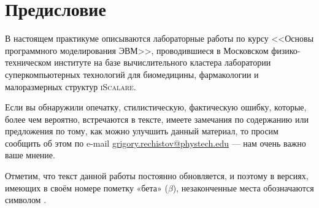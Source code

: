 \chapter*{Предисловие}\label{chap:contrib}

В настоящем практикуме описываются лабораторные работы по курсу <<Основы программного моделирования ЭВМ>>, проводившиеся в Московском физико-техническом институте на базе вычислительного кластера лаборатории суперкомпьютерных технологий для биомедицины, фармакологии и малоразмерных структур \textsc{iScalare}.

Если вы обнаружили опечатку, стилистическую, фактическую ошибку, которые, более чем вероятно, встречаются в тексте, имеете замечания по содержанию или предложения по тому, как можно улучшить данный материал, то просим сообщить об этом по e-mail \url{grigory.rechistov@phystech.edu} --- нам очень важно ваше мнение.

Отметим, что текст данной работы постоянно обновляется, и поэтому в версиях, имеющих в своём номере пометку «бета» ($\beta$), незаконченные места обозначаются символом \todo.

